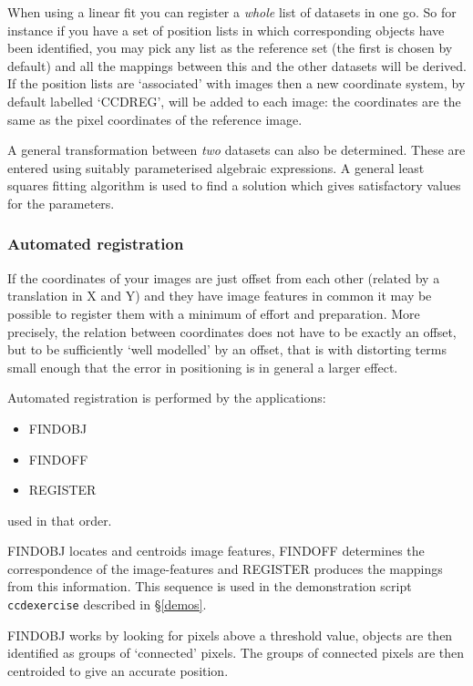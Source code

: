 \documentclass[twoside,11pt]{article}
\newcommand{\hyperref}[4]{#2\ref{#4}#3}
\newcommand{\htmlref}[2]{#1}
\newcommand{\xlabel}[1]{}
\renewcommand{\_}{\texttt{\symbol{95}}}
\newcommand{\routine}[1]{{\sc #1}}
\newcommand{\xroutine}[1]{\htmlref{{\sc #1}}{#1}}
\begin{document}
When using a linear fit you can register a {\em whole\/} list of datasets
in one go. So for instance if you have a set of position lists in which
corresponding objects have been identified, you may pick any list as the
reference set (the first is chosen by default) and all the mappings between
this and the other datasets will be derived. 
If the position lists are `associated' with images then a new 
coordinate system, 
by default labelled `CCD\_REG', will be added to each image:
the coordinates are the same as 
the pixel coordinates of the reference image.

A general transformation between {\em two\/} datasets can also be
determined. These are entered using suitably parameterised algebraic
expressions. A general least squares fitting algorithm is used to find
a solution which gives satisfactory values for the parameters.



\subsubsection{\xlabel{automatedregistration}Automated registration}

If the coordinates of your images are just offset from each other 
(related by a translation in X and Y)
and they have image features in
common it may be possible to register them with a minimum of effort and
preparation.
More precisely, the relation between coordinates does not have to
be exactly an offset, but to be
sufficiently `well modelled' by an offset, that is
with distorting terms small enough that the error in
positioning is in general a larger effect.

Automated registration is performed by the applications:
\begin{itemize}
\item \xroutine{FINDOBJ}
\item \xroutine{FINDOFF}
\item \xroutine{REGISTER}
\end{itemize}
used in that order.

\routine{FINDOBJ} locates and centroids image features,
\routine{FINDOFF} determines the
correspondence of the image-features and \routine{REGISTER} produces the
mappings from this information. This sequence is used in the
demonstration script
\hyperref{{\tt ccdexercise}}{{\tt ccdexercise} described in \S}{}{demos}.

\routine{FINDOBJ} works by looking for pixels above a threshold value, 
objects are
then identified as groups of `connected' pixels. The groups of connected
pixels are then centroided to give an accurate position.
\end{document}
